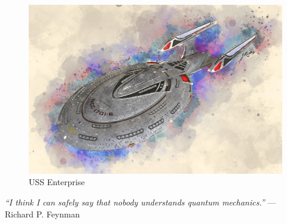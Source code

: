 \documentclass[12pt,titlepage]{article}
\begin{document}



\tableofcontents
\clearpage
\vspace*{2cm}
\begin{figure}[H]
    \centering
    \includegraphics{figures/uss_enterprise.jpg}
    \vspace*{-8mm}
    \flushleft
    USS Enterprise \cite{uss}
\end{figure}
\vspace*{\fill}
\begin{center}
    \Large
    \textit{``I think I can safely say that nobody understands quantum mechanics.''} --- Richard P. Feynman
\end{center}
\vfill

\clearpage
\setcounter{page}{1}

\pagestyle{fancy}
\doublespacing







\clearpage
{}
\begin{singlespace}


\end{singlespace}

%
\end{document}
